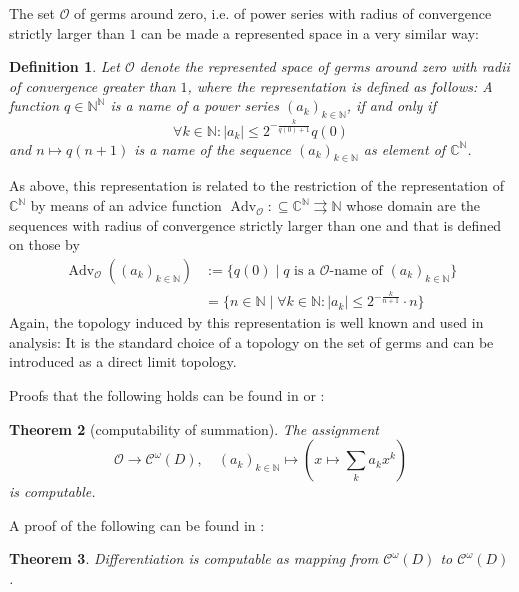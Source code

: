 \documentclass{eptcs-modified}
\newtheorem{theorem}{Theorem}
\newtheorem{definition}[theorem]{Definition}
\newcommand{\Baire}{{\mathbb{N}^\mathbb{N}}}
\newcommand{\mto}{\rightrightarrows}
\newcommand{\NN}{\mathbb{N}}
\newcommand{\CC}{\mathbb{C}}
\newcommand{\OO}{\mathcal{O}}
\newcommand{\abs}[1]{\left|#1\right|}
\newcommand{\germs}{\OO}
\newcommand{\analytic}{\mathcal C^\omega(D)}
\newcommand{\Advg}{\operatorname{Adv}_{\germs}}
\begin{document}
			The set $\OO$ of germs around zero, i.e. of power series with radius of convergence strictly larger than $1$ can be made a represented space in a very similar way:
			\begin{definition}
				Let $\germs$ denote the represented space of germs around zero with radii of convergence greater than $1$, where the representation is defined as follows: A function $q\in\Baire$ is a name of a power series $(a_k)_{k\in\NN}$, if and only if
				\[ \forall k\in\NN:|a_k|\leq 2^{-\frac k{q(0)+1}}q(0) \]
				and $n\mapsto q(n+1)$ is a name of the sequence $(a_k)_{k\in\NN}$ as element of $\CC^\NN$.
			\end{definition}

			As above, this representation is related to the restriction of the representation of $\CC^\NN$ by means of an advice function $\Advg:\subseteq \CC^\NN\mto\NN$ whose domain are the sequences with radius of convergence strictly larger than one and that is defined on those by
			\begin{equation}\label{eq:AG}
				\tag{AG}
				\begin{split}
					\Advg((a_k)_{k\in\NN}) & := \{q(0) \mid q\text{ is a $\germs$-name of $(a_k)_{k\in\NN}$}\}\\
					&= \{n\in \NN\mid \forall k\in \NN: \abs{a_k} \leq 2^{-\frac k{n+1}}\cdot n\}
				\end{split}
			\end{equation}
			Again, the topology induced by this representation is well known and used in analysis: It is the standard choice of a topology on the set of germs and can be introduced as a direct limit topology.

			Proofs that the following holds can be found in \cite{MR3377508} or \cite{Muller1995}:
			\begin{theorem}[computability of summation]\label{thm:analytic rep}
				The assignment
				\[ \OO\to \analytic, \quad (a_k)_{k\in\NN} \mapsto \left(x\mapsto \sum_k a_k x^k\right) \]
				is computable.
			\end{theorem}
			A proof of the following can be found in \cite{MR3377508}:
			\begin{theorem}\label{thm:differntiation}
				Differentiation is computable as mapping from $\analytic$ to $\analytic$.
			\end{theorem}
\end{document}
